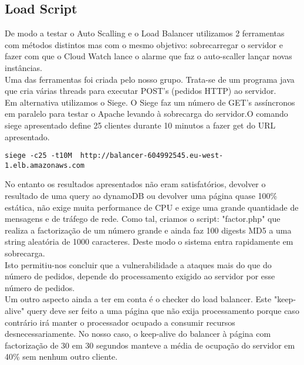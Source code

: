 \subsection{Load Script}
De modo a testar o Auto Scalling e o Load Balancer utilizamos 2 ferramentas com métodos distintos mas com o mesmo objetivo: sobrecarregar o servidor e fazer com que o Cloud Watch lance o alarme que faz o auto-scaller lançar novas instâncias.\\
Uma das ferramentas foi criada pelo nosso grupo. Trata-se de um programa java que cria várias threads para executar POST's (pedidos HTTP) ao servidor.\\
Em alternativa utilizamos o Siege. O Siege faz um número de GET's assíncronos em paralelo para testar o Apache levando à sobrecarga do servidor.O comando siege apresentado define 25 clientes durante 10 minutos a fazer get do URL apresentado.\\
\lstset{language=Bash} 
\begin{lstlisting}
siege -c25 -t10M  http://balancer-604992545.eu-west-1.elb.amazonaws.com
\end{lstlisting}
No entanto os resultados apresentados não eram satisfatórios, devolver o resultado de uma query ao dynamoDB ou devolver uma página quase 100\% estática, não exige muita performance de CPU e exige uma grande quantidade de mensagens e de tráfego de rede. Como tal, criamos o script: "factor.php" que realiza a factorização de um número grande e ainda faz 100 digests MD5 a uma string aleatória de 1000 caracteres. Deste modo o sistema entra rapidamente em sobrecarga.\\
Isto permitiu-nos concluir que a vulnerabilidade a ataques mais do que do número de pedidos, depende do processamento exigido ao servidor por esse número de pedidos.\\
Um outro aspecto ainda a ter em conta é o checker do load balancer. Este "keep-alive" query deve ser feito a uma página que não exija processamento porque caso contrário irá manter o processador ocupado a consumir recursos desnecessariamente. No nosso caso, o keep-alive do balancer à página com factorização de 30 em 30 segundos manteve a média de ocupação do servidor em 40\% sem nenhum outro cliente.



